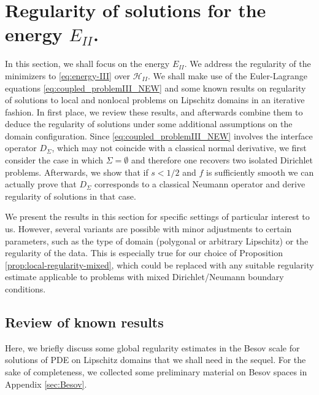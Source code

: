 \documentclass{amsart}
\def\calH{\mathcal{H}}
\theoremstyle{plain}
\numberwithin{equation}{section}
\numberwithin{table}{section}
\numberwithin{figure}{section}
\numberwithin{theorem}{section}
\numberwithin{corollary}{section}
\numberwithin{definition}{section}
\numberwithin{lemma}{section}
\numberwithin{proposition}{section}
\numberwithin{remark}{section}
\begin{document}
\section{Regularity of solutions for the energy $E_{II}$.} \label{sec:regularity}
In this section, we shall focus on the energy $E_{II}$. We address the regularity of the minimizers to \eqref{eq:energy-III} over $\calH_{II}$. We shall make use of the Euler-Lagrange equations \eqref{eq:coupled_problemIII_NEW} and some known results on regularity of solutions to local and nonlocal problems on Lipschitz domains in an iterative fashion. In first place, we review these results, and afterwards combine them to deduce the regularity of solutions under some additional assumptions on the domain configuration. Since \eqref{eq:coupled_problemIII_NEW} involves the interface operator $D_\Sigma$, which may not coincide with a classical normal derivative, we first consider the case in which $\Sigma = \emptyset$ and therefore one recovers two isolated Dirichlet problems. Afterwards, we show that if $s<1/2$ and $f$ is sufficiently smooth we can actually prove that $D_\Sigma$ corresponds to a classical Neumann operator and derive regularity of solutions in that case.

We present the results in this section for specific settings of particular interest to us. However, several variants are possible with minor adjustments to certain parameters, such as the type of domain (polygonal or arbitrary Lipschitz) or the regularity of the data. This is especially true for our choice of Proposition \ref{prop:local-regularity-mixed}, which could be replaced with any suitable regularity estimate applicable to problems with mixed Dirichlet/Neumann boundary conditions.

\subsection{Review of known results}
Here, we briefly discuss some global regularity estimates in the Besov scale for solutions of PDE on Lipschitz domains that we shall need in the sequel. For the sake of completeness, we collected some preliminary material on Besov spaces in Appendix \ref{sec:Besov}.

\end{document}
